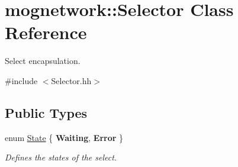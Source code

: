 \hypertarget{classmognetwork_1_1_selector}{\section{mognetwork\-:\-:Selector Class Reference}
\label{classmognetwork_1_1_selector}
}


Select encapsulation.  




{\ttfamily \#include $<$Selector.\-hh$>$}

\subsection*{Public Types}
\begin{DoxyCompactItemize}
\item 
enum \hyperlink{classmognetwork_1_1_selector_a51d709c3579bf32265d68d4313df5794}{State} \{ {\bfseries Waiting}, 
{\bfseries Error}
 \}
\begin{DoxyCompactList}\small\item\em Defines the states of the select. \end{DoxyCompactList}\end{DoxyCompactItemize}
